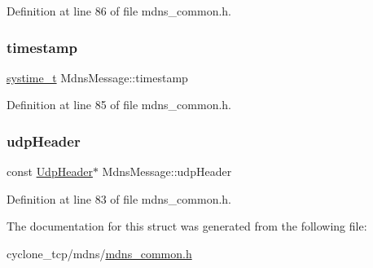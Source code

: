 Definition at line 86 of file mdns\+\_\+common.\+h.

\mbox{\label{structMdnsMessage_a525fb8a1b9335c262451c76a22a5883f}} 
\subsubsection{\texorpdfstring{timestamp}{timestamp}}
{\footnotesize\ttfamily \hyperlink{compiler__port_8h_ae3e32a98d431a02106616da3071832dd}{systime\+\_\+t} Mdns\+Message\+::timestamp}



Definition at line 85 of file mdns\+\_\+common.\+h.

\mbox{\label{structMdnsMessage_acd6f1b81f088caf914bbb89240d3f261}} 
\subsubsection{\texorpdfstring{udp\+Header}{udpHeader}}
{\footnotesize\ttfamily const \hyperlink{udp_8h_a6877bae1da8326482f5e311875e52bce}{Udp\+Header}$\ast$ Mdns\+Message\+::udp\+Header}



Definition at line 83 of file mdns\+\_\+common.\+h.



The documentation for this struct was generated from the following file\+:\begin{DoxyCompactItemize}
\item 
cyclone\+\_\+tcp/mdns/\hyperlink{mdns__common_8h}{mdns\+\_\+common.\+h}\end{DoxyCompactItemize}
